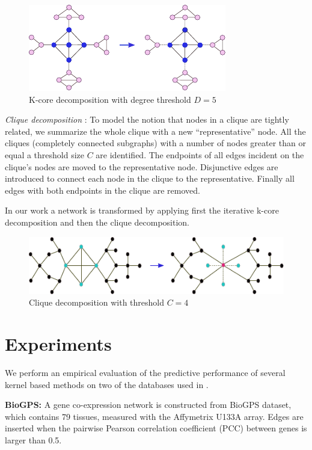 \begin{figure}
\centering
\includegraphics[width=.9\textwidth]{img/k_core}
\caption{K-core decomposition with degree threshold $D = 5$}
\label{fig:example}
\end{figure}

\textit{Clique decomposition} \cite{tarjan1985decomposition}: To model the notion that nodes in a clique are tightly related, we summarize the whole clique with a new ``representative'' node. All the cliques (completely connected subgraphs) with a number of nodes greater than or equal a threshold size $C$ are identified. The endpoints of all edges incident on the clique's nodes are moved to the representative node. Disjunctive edges are introduced to connect each node in the clique to the representative. Finally all edges with both endpoints in the clique are removed.

In our work a network is transformed by applying first the iterative k-core decomposition and then the clique decomposition.

\begin{figure}
\centering
\includegraphics[width=.9\textwidth]{img/clique}
\caption{Clique decomposition with threshold $C = 4$}
\label{fig:example}
\end{figure}

\section{Experiments}
We perform an empirical evaluation of the predictive performance of several kernel based methods on two of the databases used in \cite{chen2014disease}.

\textbf{BioGPS:} A gene co-expression network is constructed from BioGPS dataset, which contains 79 tissues, measured with the Affymetrix U133A array. Edges are inserted when the pairwise Pearson correlation coefficient (PCC) between genes is larger than 0.5.

